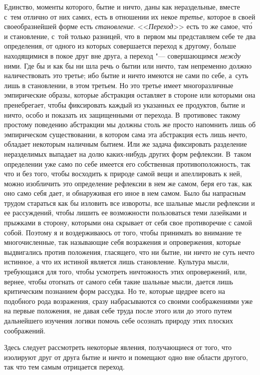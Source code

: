 Единство, моменты которого, бытие и ничто, даны как нераздельные, вместе с~тем
отлично от них самих, есть в отношении их некое {\em третье,} которое в своей
своеобразнейшей форме есть {\em становление}. <<{\em Переход}>> есть то же
самое, чт\'{о} и становление, с~той только разницей, что в~первом мы
представляем себе те два определения, от одного из которых совершается переход
к другому, больше находящимися в покое друг вне друга, а переход "---
совершающимся {\em между} ними. Где бы и как бы ни шла речь о бытии или ничто,
там непременно должно наличествовать это третье; ибо бытие и ничто имеются не
сами по себе, а~суть лишь в становлении, в этом третьем. Но это третье имеет
многоразличные эмпирические образы, которые абстракция оставляет в стороне или
которыми она пренебрегает, чтобы фиксировать каждый из указанных ее продуктов,
бытие и ничто, особо и показать их защищенными от перехода. В~противовес такому
простому поведению абстракции мы должны столь же просто напомнить лишь об
эмпирическом существовании, в котором сама эта абстракция есть лишь нечто,
обладает некоторым наличным бытием. Или же задача фиксировать разделение
неразделимых выпадает на долю каких-нибудь других форм рефлексии. В~таком
определении уже само по себе имеется его собственная противоположность, так что
и без того, чтобы восходить к природе самой вещи и апеллировать к ней, можно
изобличить это определение рефлексии в нем же самом, беря его так, как оно само
себя дает, и обнаруживая его иное в нем самом. Было бы напрасным трудом
стараться как бы изловить все извороты, все шальные мысли рефлексии и ее
рассуждений, чтобы лишить ее возможности пользоваться теми лазейками и прыжками
в сторону, которыми она скрывает от себя свое противоречие с самой собой.
Поэтому я и воздерживаюсь от того, чтобы принимать во внимание те
многочисленные, так называющие себя возражения и опровержения, которые
выдвигались против положения, гласящего, что ни бытие, ни ничто не суть нечто
истинное, а что их истиной является лишь становление. Культура мысли,
требующаяся для того, чтобы усмотреть ничтожность этих опровержений, или,
вернее, чтобы отогнать от самого себя такие шальные мысли, дается лишь
критическим познанием форм рассудка. Но те, которые щедрее всего на подобного
рода возражения, сразу набрасываются со своими соображениями уже на первые
положения, не давая себе труда после этого или до этого путем дальнейшего
изучения логики помочь себе осознать природу этих плоских соображений.

Здесь следует рассмотреть некоторые явления, получающиеся от того, что
изолируют друг от друга бытие и ничто и помещают одно вне области другого,
так что тем самым отрицается переход.

